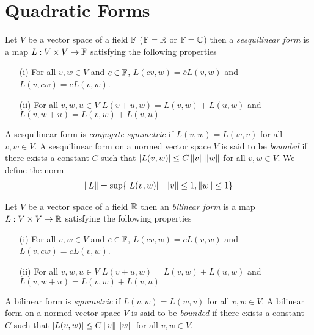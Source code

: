 \section{Quadratic Forms}


\begin{defn}Let $V$ be a vector space of a field $\mathbb{F}$ ($\mathbb{F} = \mathbb{R}$ or $\mathbb{F} = \mathbb{C}$) then a
  \emph{sesquilinear form} is a map $L : V \times V \to \mathbb{F}$ 
satisfying the following properties
\begin{itemize}
\item[(i)] For all $v,w \in V$ and $c \in \mathbb{F}$, $L(cv, w)= \overline{c} L(v,w)$ and $L(v,cw)= c L(v,w)$.
\item[(ii)] For all $v,w,u \in V$ $L(v + u, w) = L(v,w)+ L(u, w)$ and $L(v, w+u) = L(v,w) + L(v, u)$
\end{itemize}
A sesquilinear form is \emph{conjugate symmetric} if $L(v,w) = \overline{L(w,v)}$ for all $v, w \in V$.
A sesquilinear form on a normed vector space $V$ is said to be \emph{bounded} if there exists a constant $C$ such that $\left \vert L(v,w) \right \vert \leq C \left \lVert v \right \rVert \left \lVert w \right \rVert$ for all $v, w \in V$.   We define the norm 
\begin{align*}
\left \lVert L \right \rVert = \sup \lbrace \left \vert L(v,w) \right \vert \mid \left \lVert v \right \rVert \leq 1, \left \lVert w \right \rVert \leq 1 \rbrace
\end{align*}
\end{defn}

\begin{defn}Let $V$ be a vector space of a field $\mathbb{R}$ then an
  \emph{bilinear form} is a map $L : V \times V \to \mathbb{R}$ 
satisfying the following properties
\begin{itemize}
\item[(i)] For all $v,w \in V$ and $c \in \mathbb{F}$, $L(cv, w)= c L(v,w)$ and $L(v,cw)= c L(v,w)$.
\item[(ii)] For all $v,w,u \in V$ $L(v + u, w) = L(v,w)+ L(u, w)$ and $L(v, w+u) = L(v,w) + L(v, u)$
\end{itemize}
A bilinear form is \emph{symmetric} if $L(v,w) = L(w,v)$ for all $v,w \in V$.
A bilinear form on a normed vector space $V$ is said to be \emph{bounded} if there exists a constant $C$ such that $\left \vert L(v,w) \right \vert \leq C \left \lVert v \right \rVert \left \lVert w \right \rVert$ for all $v, w \in V$.
\end{defn}

